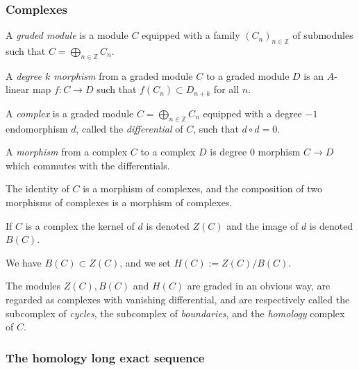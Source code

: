 \documentclass[parskip=half,fontsize=12pt]{scrartcl}%
\begin{document}

\subsubsection{Complexes}%

A \emph{graded module} is a module $C$ equipped with a family $(C_n)_{n\in\mathbb Z}$ of submodules such that $C=\bigoplus_{n\in\mathbb Z}C_n$. 

A \emph{degree $k$ morphism} from a graded module $C$ to a graded module $D$ is an $A$-linear map $f:C\to D$ such that $f(C_n)\subset D_{n+k}$ for all $n$. 

A \emph{complex} is a graded module $C=\bigoplus_{n\in\mathbb Z}C_n$ equipped with a degree $-1$ endomorphism $d$, called the \emph{differential} of $C$, such that $d\circ d=0$. 

A \emph{morphism} from a complex $C$ to a complex $D$ is degree $0$ morphism $C\to D$ which commutes with the differentials. 

The identity of $C$ is a morphism of complexes, and the composition of two morphisms of complexes is a morphism of complexes. 

If $C$ is a complex the kernel of $d$ is denoted $Z(C)$ and the image of $d$ is denoted $B(C)$. 

We have $B(C)\subset Z(C)$, and we set $H(C):=Z(C)/B(C)$. 

The modules $Z(C),B(C)$ and $H(C)$ are graded in an obvious way, are regarded as complexes with vanishing differential, and are respectively called the subcomplex of \emph{cycles}, the subcomplex of \emph{boundaries}, and the \emph{homology} complex of $C$.



\subsubsection{The homology long exact sequence}\label{hles}%
\end{document}
